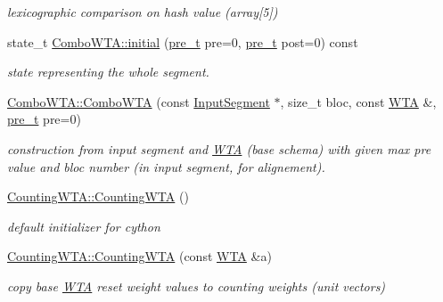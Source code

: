 \begin{DoxyCompactItemize}
\begin{DoxyCompactList}\small\item\em lexicographic comparison on hash value (array\mbox{[}5\mbox{]}) \end{DoxyCompactList}\item 
state\+\_\+t \mbox{\hyperlink{group__schemata_ga2a6c3a5867fefdac97470fd083aaa2dd}{Combo\+W\+T\+A\+::initial}} (\mbox{\hyperlink{group__general_ga092fe8b972dfa977c2a0886720a7731e}{pre\+\_\+t}} pre=0, \mbox{\hyperlink{group__general_ga092fe8b972dfa977c2a0886720a7731e}{pre\+\_\+t}} post=0) const
\begin{DoxyCompactList}\small\item\em state representing the whole segment. \end{DoxyCompactList}\item 
\mbox{\label{group__schemata_ga4c589573251ec74dbe6a3c9176c39bb7}} 
\mbox{\hyperlink{group__schemata_ga4c589573251ec74dbe6a3c9176c39bb7}{Combo\+W\+T\+A\+::\+Combo\+W\+TA}} (const \mbox{\hyperlink{classInputSegment}{Input\+Segment}} $\ast$, size\+\_\+t bloc, const \mbox{\hyperlink{classWTA}{W\+TA}} \&, \mbox{\hyperlink{group__general_ga092fe8b972dfa977c2a0886720a7731e}{pre\+\_\+t}} pre=0)
\begin{DoxyCompactList}\small\item\em construction from input segment and \mbox{\hyperlink{classWTA}{W\+TA}} (base schema) with given max pre value and bloc number (in input segment, for alignement). \end{DoxyCompactList}\item 
\mbox{\label{group__schemata_gad46a7f821d01aed3719a585f66130e27}} 
\mbox{\hyperlink{group__schemata_gad46a7f821d01aed3719a585f66130e27}{Counting\+W\+T\+A\+::\+Counting\+W\+TA}} ()
\begin{DoxyCompactList}\small\item\em default initializer for cython \end{DoxyCompactList}\item 
\mbox{\label{group__schemata_ga590bb9036b59d5cf81bbbedb18d19093}} 
\mbox{\hyperlink{group__schemata_ga590bb9036b59d5cf81bbbedb18d19093}{Counting\+W\+T\+A\+::\+Counting\+W\+TA}} (const \mbox{\hyperlink{classWTA}{W\+TA}} \&a)
\begin{DoxyCompactList}\small\item\em copy base \mbox{\hyperlink{classWTA}{W\+TA}} reset weight values to counting weights (unit vectors) \end{DoxyCompactList}\item 

\end{DoxyCompactItemize}
